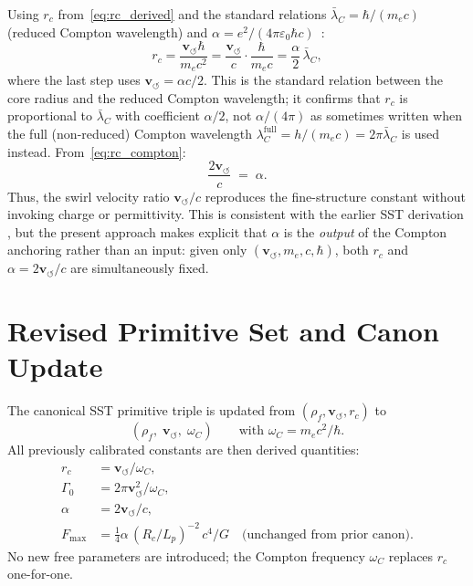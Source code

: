 \documentclass[11pt,a4paper]{article}
\newcommand{\rc}{r_c}
\newcommand{\vswirl}{\mathbf{v}_{\scriptscriptstyle\boldsymbol{\circlearrowleft}}}
\newcommand{\rhof}{\rho_{\!f}}
\newcommand{\GammaZ}{\Gamma_0}
\newcommand{\omC}{\omega_C}
\newcommand{\lambdaC}{\lambda_C}
\begin{document}
Using $\rc$ from~\eqref{eq:rc_derived} and the standard relations
$\bar\lambdaC=\hbar/(m_e c)$ (reduced Compton wavelength) and
$\alpha=e^2/(4\pi\varepsilon_0\hbar c)$~\cite{MohrTaylor2016}:
\begin{equation}
  \rc = \frac{\vswirl\hbar}{m_e c^2}
      = \frac{\vswirl}{c}\cdot\frac{\hbar}{m_e c}
      = \frac{\alpha}{2}\,\bar\lambdaC,
  \label{eq:rc_compton}
\end{equation}
where the last step uses $\vswirl=\alpha c/2$.  This is the standard
relation between the core radius and the reduced Compton wavelength;
it confirms that $\rc$ is proportional to $\bar\lambdaC$ with
coefficient $\alpha/2$, not $\alpha/(4\pi)$ as sometimes
written when the full (non-reduced) Compton wavelength
$\lambdaC^{\mathrm{full}}=h/(m_ec)=2\pi\bar\lambdaC$ is used
instead.  From~\eqref{eq:rc_compton}:
\begin{equation}
  \frac{2\vswirl}{c} \;=\; \alpha.
  \label{eq:alpha_emergent}
\end{equation}
Thus, the swirl velocity ratio $\vswirl/c$ reproduces the
fine-structure constant without invoking charge or permittivity.
This is consistent with the earlier SST derivation
\cite{IskandaraniVAMCore2025}, but the present approach makes
explicit that $\alpha$ is the \emph{output} of the Compton
anchoring rather than an input: given only
$(\vswirl,m_e,c,\hbar)$, both $\rc$
and $\alpha=2\vswirl/c$ are simultaneously fixed.

\section{Revised Primitive Set and Canon Update}

The canonical SST primitive triple is updated from
$(\rhof,\vswirl,\rc)$ to
\begin{equation}
  \boxed{
    (\rhof,\;\vswirl,\;\omC)
    \qquad
    \text{with } \omC = m_e c^2/\hbar.
  }
  \label{eq:new_primitives}
\end{equation}
All previously calibrated constants are then derived quantities:
\begin{align}
  \rc      &= \vswirl/\omC,                              \label{eq:rc_canon}\\
  \GammaZ  &= 2\pi\vswirl^2/\omC,                       \label{eq:G0_canon}\\
  \alpha   &= 2\vswirl/c,                                \label{eq:alpha_canon}\\
  F_{\max} &= \tfrac{1}{4}\alpha\,(R_c/L_p)^{-2}\,c^4/G \quad
             \text{(unchanged from prior canon)}.
\end{align}
No new free parameters are introduced; the
Compton frequency $\omC$ replaces $\rc$ one-for-one.
\end{document}

